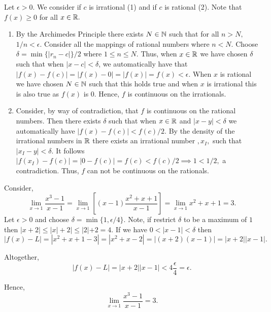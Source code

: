 \documentclass{report}
\begin{document}
\begin{myproof}

  Let $\epsilon > 0.$ We consider if $c$ is irrational (1) and if $c$ is rational (2). Note that $f(x) \geq0 $ for all $x \in \RR.$

  \begin{enumerate}
    \item 
  By the Archimedes Principle there exists $N \in \NN$ such that for all $n>N,$ $1/n < \epsilon.$ Consider all the mappings of rational numbers where $n<N$. Choose $\delta = \min\{|r_n - c|\}/2$ where $1\leq n \leq N.$ Thus, when $x\in \RR$ we have chosen $\delta$ such that when $|x-c|< \delta$, we automatically have that $|f(x) - f(c)|= |f(x) - 0| = |f(x)| = f(x)<\epsilon.$ When $x$ is rational we have chosen $N\in\NN$ such that this holds true and when $x$ is irrational this is also true as $f(x)$ is  0. Hence, $f$ is continuous on the irrationals.
\item Consider, by way of contradiction, that $f$ is continuous on the rational numbers. Then there exists $\delta$ such that when $x\in \RR$ and $|x-y| <\delta$ we automatically have $|f(x) - f(c)| < f(c)/2.$ By the density of the irrational numbers in $\RR$ there exists an irrational number $,x_I,$ such that $|x_I - y| < \delta.$ It follows $|f(x_I) - f(c)|= |0 - f(c)| = f(c) < f(c)/2 \implies 1 < 1/2,$ a contradiction. Thus, $f$ can not be continuous on the rationals.
      
  \end{enumerate}

    
\end{myproof}

\begin{myproof}
  Consider,
  $$ \lim _{x \rightarrow 1} \frac{x^3-1}{x-1}= \lim _{x \rightarrow 1}\left[ (x-1)\frac{x^2+x+1}{x-1}\right]= \lim _{x \rightarrow 1}x^2+x+1 = 3.$$ Let $\epsilon >0$ and choose $\delta = \min\{1,\epsilon/4\}$. Note, if restrict $\delta$ to be a maximum of $1$ then $|x+2| \leq |x| + 2 | \leq |2| + 2 = 4.$
 If we have $0<|x-1| < \delta$ then $$|f(x) - L|= |x^2 +x +1 - 3| = |x^2 +x- 2|= |(x+2)(x-1)| = |x+2||x-1|.$$


Altogether, $$|f(x) - L| = |x+2||x-1|<4  \frac{\epsilon}{4}= \epsilon.$$

Hence, 
$$\lim _{x \rightarrow 1} \frac{x^3-1}{x-1}=3.$$

\end{myproof}
\end{document}
